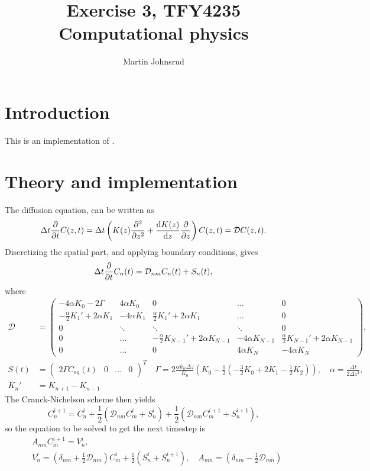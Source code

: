 \documentclass{article}
\title{Exercise 3, TFY4235 Computational physics}
\author{Martin Johnsrud}
\date{}
\begin{document}
    \maketitle
    \section*{Introduction}
        This is an implementation of \cite{exercise}.
    \section*{Theory and implementation}
    The diffusion equation, can be written as
    \begin{equation*}
        \Delta t \pdv{t} C(z, t) = \Delta t \left(K(z) \pdv[2]{z} + \dv{K(z)}{z}\pdv{z}\right) C(z, t) = \mathcal{D} C(z, t).
    \end{equation*}
    Discretizing the spatial part, and applying boundary conditions, gives
    \begin{equation*}
        \Delta t \pdv{t} C_n(t) = \mathcal{D}_{nm} C_n(t) + S_n(t),
    \end{equation*}
    where 
    \begin{align*}
        \mathcal{D} &=
        \begin{pmatrix}
            -4\alpha K_0 - 2\Gamma & 4\alpha K_0 & 0 & \dots&0 \\
            -\frac{\alpha}{2} K_1' + 2\alpha K_1 & -4 \alpha K_1 & \frac{\alpha}{2}K_1' + 2\alpha K_1 &  \dots & 0 \\
            0 & \ddots & \ddots & \ddots & 0\\
            0 & \dots &-\frac{\alpha}{2} K_{N-1}' + 2\alpha K_{N-1} & -4 \alpha K_{N-1} & \frac{\alpha}{2}K_{N-1}' + 2\alpha K_{N-1} \\
             0 & \dots & 0 & 4\alpha K_N & -4\alpha K_N
        \end{pmatrix},\\
        S(t) & =  
        \begin{pmatrix}
            2\Gamma C_\mathrm{eq}(t) &0&\dots&0
        \end{pmatrix}^T \quad 
    \Gamma = 2 \frac{\alpha k_w \Delta z}{K_0} \left(K_0 - \frac{1}{2}(-\frac{3}{2} K_0 + 2K_1 - \frac{1}{2}K_2)\right), \quad
     \alpha = \frac{\Delta t}{2 \Delta z^2 },\\
      K_n' & = K_{n+1} - K_{n-1}
    \end{align*}
    The Cranck-Nichelson scheme then yields
    \begin{equation*}
        C_n^{i+1}  = C_n^i + \frac{1}{2} (\mathcal{D}_{nm} C_m^i + S_n^i) + \frac{1}{2} (\mathcal{D}_{nm} C_m^{i+1} + S_n^{i+1}),
    \end{equation*}
    so the equation to be solved to get the next timestep is
    \begin{align*}
        & A_{nm} C_{m}^{i+1} = V_n^i, \\ 
        & V_n^i = \left(\delta_{nm} + \frac{1}{2} \mathcal{D}_{nm}\right) C_m^i + \frac{1}{2}(S_n^i + S_n^{i+1}), \quad 
        A_{mn} = \left(\delta_{nm} - \frac{1}{2} \mathcal{D}_{nm}\right)
    \end{align*}
    
\end{document}
